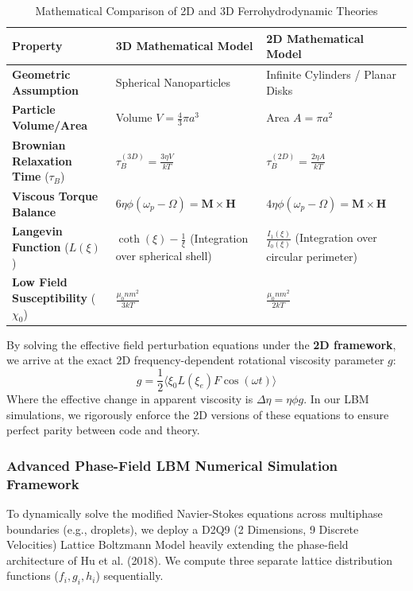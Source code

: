 \documentclass[11pt, a4paper]{article}
\begin{document}
\begin{table}[H]
\centering
\caption{Mathematical Comparison of 2D and 3D Ferrohydrodynamic Theories}
\begin{tabular}{p{4.5cm} p{5cm} p{5cm}}
\toprule
\textbf{Property} & \textbf{3D Mathematical Model} & \textbf{2D Mathematical Model} \\
\midrule
\textbf{Geometric Assumption} & Spherical Nanoparticles & Infinite Cylinders / Planar Disks \\
\textbf{Particle Volume/Area} & Volume $V = \frac{4}{3}\pi a^3$ & Area $A = \pi a^2$ \\
\textbf{Brownian Relaxation Time} ($\tau_B$) & $\displaystyle \tau_B^{(3D)} = \frac{3\eta V}{kT}$ & $\displaystyle \tau_B^{(2D)} = \frac{2\eta A}{kT}$ \\
\textbf{Viscous Torque Balance} & $6\eta\phi(\omega_p - \Omega) = \mathbf{M} \times \mathbf{H}$ & $4\eta\phi(\omega_p - \Omega) = \mathbf{M} \times \mathbf{H}$ \\
\textbf{Langevin Function} ($L(\xi)$) & $\displaystyle \coth(\xi) - \frac{1}{\xi}$ \newline (Integration over spherical shell) & $\displaystyle \frac{I_1(\xi)}{I_0(\xi)}$ \newline (Integration over circular perimeter) \\
\textbf{Low Field Susceptibility} ($\chi_0$) & $\displaystyle \frac{\mu_0 n m^2}{3kT}$ & $\displaystyle \frac{\mu_0 n m^2}{2kT}$ \\
\bottomrule
\end{tabular}
\end{table}

By solving the effective field perturbation equations under the \textbf{2D framework}, we arrive at the exact 2D frequency-dependent rotational viscosity parameter $g$:
\begin{equation}
    g = \frac{1}{2} \langle \xi_0 L(\xi_e) F \cos(\omega t) \rangle
\end{equation}
Where the effective change in apparent viscosity is $\Delta\eta = \eta\phi g$. In our LBM simulations, we rigorously enforce the 2D versions of these equations to ensure perfect parity between code and theory.

\subsubsection{Advanced Phase-Field LBM Numerical Simulation Framework}
To dynamically solve the modified Navier-Stokes equations across multiphase boundaries (e.g., droplets), we deploy a D2Q9 (2 Dimensions, 9 Discrete Velocities) Lattice Boltzmann Model heavily extending the phase-field architecture of Hu et al. (2018). We compute three separate lattice distribution functions ($f_i, g_i, h_i$) sequentially.
\end{document}
